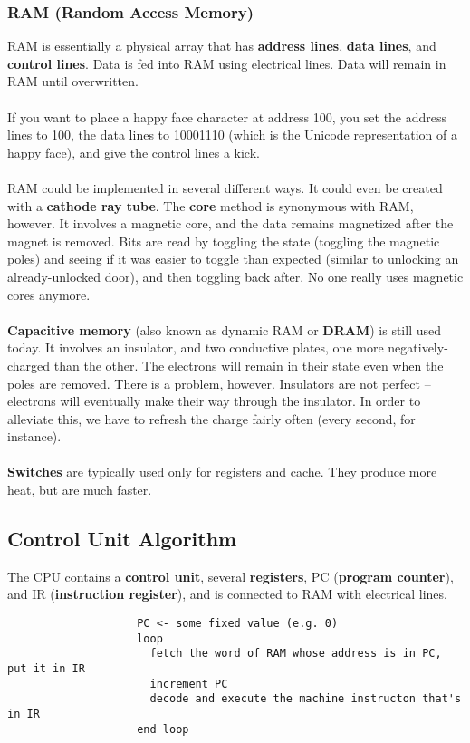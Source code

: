 \documentclass[]{article}
\theoremstyle{definition}
\begin{document}
			\subsubsection{RAM (Random Access Memory)}
				RAM is essentially a physical array that has \textbf{address lines}, \textbf{data lines}, and \textbf{control lines}. Data is fed into RAM using electrical lines. Data will remain in RAM until overwritten.
				\\ \\
				If you want to place a happy face character at address 100, you set the address lines to 100, the data lines to 10001110 (which is the Unicode representation of a happy face), and give the control lines a kick.
				\\ \\ %
				RAM could be implemented in several different ways. It could even be created with a \textbf{cathode ray tube}. The \textbf{core} method is synonymous with RAM, however. It involves a magnetic core, and the data remains magnetized after the magnet is removed. Bits are read by toggling the state (toggling the magnetic poles) and seeing if it was easier to toggle than expected (similar to unlocking an already-unlocked door), and then toggling back after. No one really uses magnetic cores anymore.
				\\ \\ %
				\textbf{Capacitive memory} (also known as dynamic RAM or \textbf{DRAM}) is still used today. It involves an insulator, and two conductive plates, one more negatively-charged than the other. The electrons will remain in their state even when the poles are removed. There is a problem, however. Insulators are not perfect -- electrons will eventually make their way through the insulator. In order to alleviate this, we have to refresh the charge fairly often (every second, for instance).
				\\ \\ %
				\textbf{Switches} are typically used only for registers and cache. They produce more heat, but are much faster.
			\subsection{Control Unit Algorithm}
				The CPU contains a \textbf{control unit}, several \textbf{registers}, PC (\textbf{program counter}), and IR (\textbf{instruction register}), and is connected to RAM with electrical lines.
				\begin{verbatim}
					PC <- some fixed value (e.g. 0)
					loop
					  fetch the word of RAM whose address is in PC, put it in IR
					  increment PC
					  decode and execute the machine instructon that's in IR
					end loop
				\end{verbatim}
\end{document}
